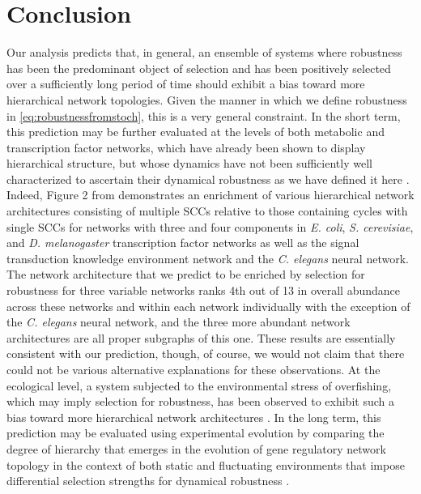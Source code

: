 \section{Conclusion}
Our analysis predicts that, in general, an ensemble of systems where robustness has been the predominant object of selection and has been positively selected over a sufficiently long period of time should exhibit a bias toward more hierarchical network topologies. Given the manner in which we define robustness in \ref{eq:robustnessfromstoch}, this is a very general constraint. In the short term, this prediction may be further evaluated at the levels of both metabolic and transcription factor networks, which have already been shown to display hierarchical structure, but whose dynamics have not been sufficiently well characterized to ascertain their dynamical robustness as we have defined it here \cite{Zhao2006,Bhardwaj2010,Colm,Prill2005}. Indeed, Figure 2 from \cite{Prill2005} demonstrates an enrichment of various hierarchical network architectures consisting of multiple SCCs relative to those containing cycles with single SCCs for networks with three and four components in \emph{E. coli}, \emph{S. cerevisiae}, and \emph{D. melanogaster} transcription factor networks as well as the signal transduction knowledge environment network and the \emph{C. elegans} neural network. The network architecture that we predict to be enriched by selection for robustness for three variable networks ranks 4th out of 13 in overall abundance across these networks and within each network individually with the exception of the \emph{C. elegans} neural network, and the three more abundant network architectures are all proper subgraphs of this one. These results are essentially consistent with our prediction, though, of course, we would not claim that there could not be various alternative explanations for these observations. At the ecological level, a system subjected to the environmental stress of overfishing, which may imply selection for robustness, has been observed to exhibit such a bias toward more hierarchical network architectures \cite{Bascompte2005}.
In the long term, this prediction may be evaluated using experimental evolution by comparing the degree of hierarchy that emerges in the evolution of gene regulatory network topology in the context of both static and fluctuating environments that impose differential selection strengths for dynamical robustness \cite{Leroi1994}.

